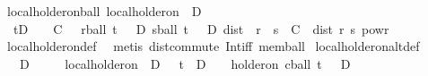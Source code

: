 \begin{isabellebody}
\endisatagproof
{\isafoldproof}%
%
\isadelimproof
\isanewline
%
\endisadelimproof
\isanewline
{}\isamarkupfalse%
\ local{\isacharunderscore}{\kern0pt}holder{\isacharunderscore}{\kern0pt}on{\isacharunderscore}{\kern0pt}ball{\isacharcolon}{\kern0pt}\ {\isachardoublequoteopen}local{\isacharunderscore}{\kern0pt}holder{\isacharunderscore}{\kern0pt}on\ {\isasymgamma}\ D\ {\isasymphi}\ {\isasymlongleftrightarrow}\ {\isasymgamma}\ {\isasymin}\ {\isacharbraceleft}{\kern0pt}{}{\isacharless}{\kern0pt}{\isachardot}{\kern0pt}{\isachardot}{\kern0pt}{}{\isacharbraceright}{\kern0pt}\ {\isasymand}\isanewline
\ \ {\isacharparenleft}{\kern0pt}{\isasymforall}t{\isasymin}D{\isachardot}{\kern0pt}\ {\isasymexists}{\isasymepsilon}\ {\isachargreater}{\kern0pt}\ {}{\isachardot}{\kern0pt}\ {\isasymexists}C\ {\isasymge}\ {}{\isachardot}{\kern0pt}\ {\isacharparenleft}{\kern0pt}{\isasymforall}r{\isasymin}ball\ t\ {\isasymepsilon}\ {\isasyminter}\ D{\isachardot}{\kern0pt}\ {\isasymforall}s{\isasymin}ball\ t\ {\isasymepsilon}\ {\isasyminter}\ D{\isachardot}{\kern0pt}\ dist\ {\isacharparenleft}{\kern0pt}{\isasymphi}\ r{\isacharparenright}{\kern0pt}\ {\isacharparenleft}{\kern0pt}{\isasymphi}\ s{\isacharparenright}{\kern0pt}\ {\isasymle}\ C\ {\isacharasterisk}{\kern0pt}\ dist\ r\ s\ powr\ {\isasymgamma}{\isacharparenright}{\kern0pt}{\isacharparenright}{\kern0pt}{\isachardoublequoteclose}\isanewline
%
\isadelimproof
\ \ %
\endisadelimproof
%
\isatagproof
{}\isamarkupfalse%
\ local{\isacharunderscore}{\kern0pt}holder{\isacharunderscore}{\kern0pt}on{\isacharunderscore}{\kern0pt}def\ \isamarkupfalse%
\ {\isacharparenleft}{\kern0pt}metis\ dist{\isacharunderscore}{\kern0pt}commute\ Int{\isacharunderscore}{\kern0pt}iff\ mem{\isacharunderscore}{\kern0pt}ball{\isacharparenright}{\kern0pt}%
\endisatagproof
{\isafoldproof}%
%
\isadelimproof
\isanewline
%
\endisadelimproof
\isanewline
{}\isamarkupfalse%
\ local{\isacharunderscore}{\kern0pt}holder{\isacharunderscore}{\kern0pt}on{\isacharunderscore}{\kern0pt}altdef{\isacharcolon}{\kern0pt}\isanewline
\ \ \ {\isachardoublequoteopen}D\ {\isasymnoteq}\ {\isacharbraceleft}{\kern0pt}{\isacharbraceright}{\kern0pt}{\isachardoublequoteclose}\isanewline
\ \ \ {\isachardoublequoteopen}local{\isacharunderscore}{\kern0pt}holder{\isacharunderscore}{\kern0pt}on\ {\isasymgamma}\ D\ {\isasymphi}\ {\isacharequal}{\kern0pt}\ {\isacharparenleft}{\kern0pt}{\isasymforall}t\ {\isasymin}\ D{\isachardot}{\kern0pt}\ {\isacharparenleft}{\kern0pt}{\isasymexists}{\isasymepsilon}\ {\isachargreater}{\kern0pt}\ {}{\isachardot}{\kern0pt}\ {\isacharparenleft}{\kern0pt}{\isasymgamma}{\isacharminus}{\kern0pt}holder{\isacharunderscore}{\kern0pt}on\ {\isacharparenleft}{\kern0pt}{\isacharparenleft}{\kern0pt}cball\ t\ {\isasymepsilon}{\isacharparenright}{\kern0pt}\ {\isasyminter}\ D{\isacharparenright}{\kern0pt}\ {\isasymphi}{\isacharparenright}{\kern0pt}{\isacharparenright}{\kern0pt}{\isacharparenright}{\kern0pt}{\isachardoublequoteclose}\isanewline

\end{isabellebody}
